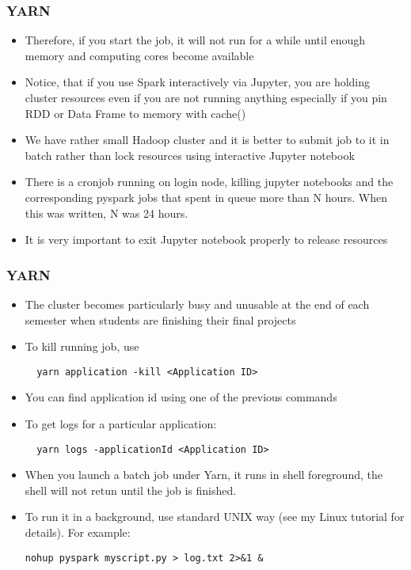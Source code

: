 \documentclass{beamer}
\begin{document}
\begin{frame}[fragile]
  \frametitle{YARN}
  \begin{itemize}
  \item Therefore, if you start the job, it will not run for a while until enough memory and computing cores become available
  \item Notice, that if you use Spark interactively via Jupyter, you are holding cluster resources even if you are not running anything
    especially if you pin RDD or Data Frame to memory with {\color{mycolorcode}cache()}
  \item We have rather small Hadoop cluster and it is better to submit job to it in batch rather than lock resources using
    interactive Jupyter notebook
  \item There is a cronjob running on login node, killing jupyter notebooks and the corresponding pyspark jobs that spent in queue more
    than N hours. When this was written, N was 24 hours.
  \item It is very important to exit Jupyter notebook properly to release resources
  \end{itemize}
\end{frame}


\begin{frame}[fragile]
  \frametitle{YARN}
  \begin{itemize}
  \item The cluster becomes particularly busy and unusable at the end of each semester when students are finishing their final projects
  \item To kill running job, use
    {\color{mycolorcli}
\begin{verbatim}
  yarn application -kill <Application ID>
\end{verbatim}
    }
  \item You can find application id using one of the previous commands
  \item To get logs for a particular application:
    {\color{mycolorcli}
\begin{verbatim}
  yarn logs -applicationId <Application ID>
\end{verbatim}
    }
  \item When you launch a batch job under Yarn, it runs in shell foreground, the shell will not retun until the job is finished.
  \item To run it in a background, use standard UNIX way (see my Linux tutorial for details). For example:
    {\color{mycolorcli}
\begin{verbatim}
nohup pyspark myscript.py > log.txt 2>&1 &
\end{verbatim}        
} 
  \end{itemize}
\end{frame}
\end{document}
